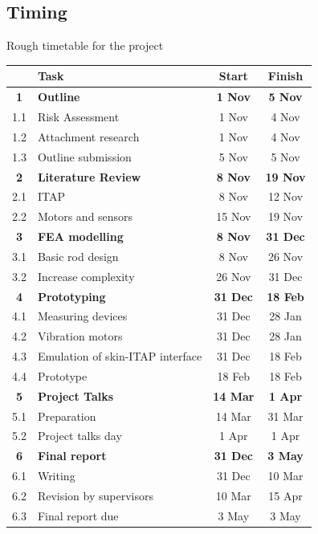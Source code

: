 \subsection{Timing}
Rough timetable for the project
\begin{table}[h]
\centering
\begin{tabular}{clcc}
      & Task & Start & Finish \\ \hline
    \textbf{1} & \textbf{Outline} & \textbf{1 Nov} & \textbf{5 Nov} \\
    1.1 & Risk Assessment & 1 Nov & 4 Nov \\
    1.2 & Attachment research &1 Nov &4 Nov \\
    1.3 & Outline submission &5 Nov &5 Nov \\

    \textbf{2} & \textbf{Literature Review} & \textbf{8 Nov} &\textbf{ 19 Nov }\\
    2.1 & ITAP &8 Nov &12 Nov \\
    2.2 & Motors and sensors & 15 Nov & 19 Nov \\

    \textbf{3} & \textbf{FEA modelling} & \textbf{8 Nov} & \textbf{31 Dec} \\
    3.1 & Basic rod design & 8 Nov & 26 Nov \\
    3.2 & Increase complexity & 26 Nov & 31 Dec \\
    
    \textbf{4} & \textbf{Prototyping} & \textbf{31 Dec} & \textbf{18 Feb }\\
    4.1 & Measuring devices & 31 Dec & 28 Jan \\
    4.2 & Vibration motors & 31 Dec & 28 Jan \\
    4.3 & Emulation of skin-ITAP interface & 31 Dec & 18 Feb \\
    4.4 & Prototype & 18 Feb & 18 Feb \\
    
    \textbf{5} & \textbf{Project Talks} & \textbf{14 Mar} & \textbf{1 Apr} \\
    5.1 & Preparation & 14 Mar & 31 Mar\\
    5.2 & Project talks day & 1 Apr & 1 Apr\\

    \textbf{6} & \textbf{Final report} & \textbf{31 Dec} & \textbf{3 May} \\
    6.1 & Writing & 31 Dec & 10 Mar \\
    6.2 & Revision by supervisors & 10 Mar & 15 Apr \\
    6.3 & Final report due & 3 May & 3 May \\
\end{tabular}
\end{table}



